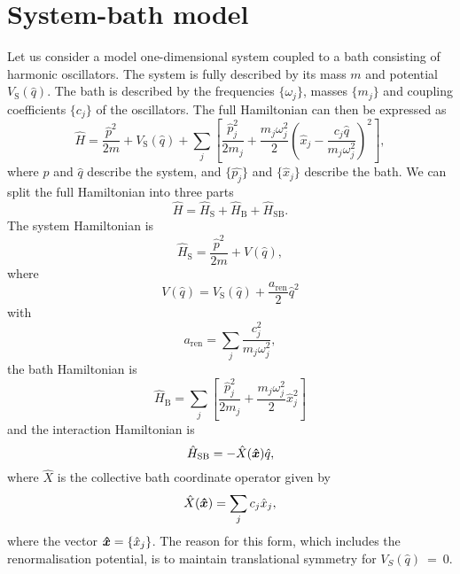 \section{System-bath model}\label{sec:system_bath}
Let us consider a model one-dimensional system coupled to a bath consisting of harmonic oscillators. The system is fully described by its mass $m$ and potential $V_\mathrm{S}(\hat{q})$. The bath is described by the frequencies $\{\omega_j\}$, masses $\{m_j\}$ and coupling coefficients $\{c_j\}$ of the oscillators. The full Hamiltonian can then be expressed as
\begin{equation}
	\hat{H} = \frac{\hat{p}^2}{2m} + V_\mathrm{S}(\hat{q}) + \sum_{j} \left[\frac{\hat{p}_j^2}{2m_j} + \frac{m_j \omega_j^2}{2}\left(\hat{x}_j - \frac{c_j \hat{q}}{m_j \omega_j^2}\right)^2\right],
\end{equation}
where $\hat{p}$ and $\hat{q}$ describe the system, and $\{\hat{p_j}\}$ and $\{\hat{x}_j\}$ describe the bath. We can split the full Hamiltonian into three parts
\begin{equation}
	\hat{H} = \hat{H}_\mathrm{S} + \hat{H}_\mathrm{B} + \hat{H}_\mathrm{SB}.
\end{equation}
The system Hamiltonian is
\begin{equation}
	\hat{H}_\mathrm{S} = \frac{\hat{p}^2}{2m} + V(\hat{q}),
\end{equation}
where
\begin{equation}
V(\hat{q}) = V_\mathrm{S}(\hat{q}) + \frac{a_\mathrm{ren}}{2}\hat{q}^2
\label{eq:renorm_pot}
\end{equation}
with
\begin{equation}
	a_\mathrm{ren} = \sum_j \frac{c_j^2}{m_j \omega_j^2},
\end{equation}
the bath Hamiltonian is
\begin{equation}
	\hat{H}_\mathrm{B} = \sum_{j}\left[ \frac{\hat{p}_j^2}{2m_j} + \frac{m_j \omega_j^2}{2}\hat{x}_j^2 \right]
\end{equation}
and the interaction Hamiltonian is
\begin{equation}
	\hat{H}_\mathrm{SB} = -\hat{X}(\bm{\hat{x}})\hat{q},
\end{equation}
where $\hat{X}$ is the collective bath coordinate operator given by
\begin{equation}
	\hat{X}(\bm{\hat{x}}) = \sum_j c_j \hat{x}_j,
\end{equation}
where the vector $\bm{\hat{x}}= \{\hat{x}_j\}$. The reason for this form, which includes the renormalisation potential, is to maintain translational symmetry for $V_S(\hat{q})~=~0$.\supercite{Caldeira1983b}


